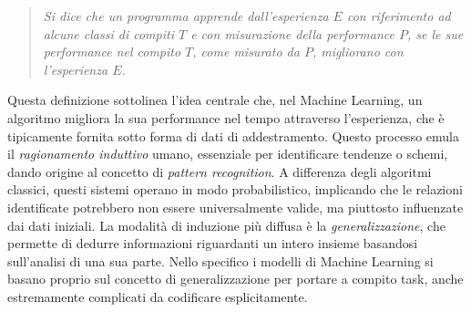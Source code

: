 \documentclass[12pt,a4paper,twoside,openright]{book}
\begin{document}
\begin{quote}
    \emph{
    Si dice che un programma apprende dall'esperienza $E$ con riferimento ad alcune classi di compiti $T$ e con misurazione della performance $P$, se le sue performance nel compito $T$, come misurato da $P$, migliorano con l'esperienza $E$.}
\end{quote}

Questa definizione sottolinea l'idea centrale che, nel Machine Learning, un algoritmo migliora la sua performance nel tempo attraverso l'esperienza, che è tipicamente fornita sotto forma di dati di addestramento.
Questo processo emula il \emph{ragionamento induttivo} umano, essenziale per identificare tendenze o schemi, dando origine al concetto di \emph{pattern recognition}. A differenza degli algoritmi classici, questi sistemi operano in modo probabilistico, implicando che le relazioni identificate potrebbero non essere universalmente valide, ma piuttosto influenzate dai dati iniziali. La modalità di induzione più diffusa è la \emph{generalizzazione}, che permette di dedurre informazioni riguardanti un intero insieme basandosi sull'analisi di una sua parte.
Nello specifico i modelli di Machine Learning si basano proprio sul concetto di generalizzazione per portare a compito task, anche estremamente complicati da codificare esplicitamente. 
\end{document}
